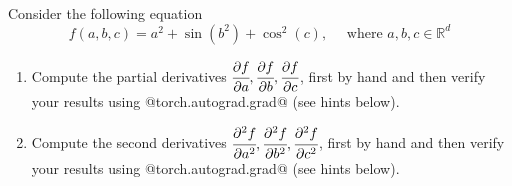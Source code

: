 

Consider the following equation
$$
f(a, b, c) = a^2 + \sin(b^2) + \cos^2(c), \quad \text{ where } a,b,c\in\mathbb{R}^d
$$

\begin{enumerate}
    \item Compute the partial derivatives $\cfrac{\partial f}{\partial a}, \cfrac{\partial f}{\partial b}, \cfrac{\partial f}{\partial c}$, first by hand and then verify your results using @torch.autograd.grad@ (see hints below).    
    \item Compute the second derivatives $\cfrac{\partial^2 f}{\partial a^2}, \cfrac{\partial^2 f}{\partial b^2}, \cfrac{\partial^2 f}{\partial c^2}$, first by hand and then verify your results using @torch.autograd.grad@ (see hints below).
\end{enumerate}

